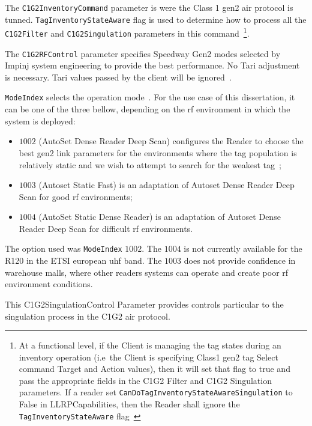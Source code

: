 The \texttt{C1G2InventoryCommand} parameter is were the Class 1 \ac{gen2} air protocol is tunned.
\texttt{TagInventoryStateAware} flag is used to determine how to process all the \texttt{C1G2Filter} and \texttt{C1G2Singulation} parameters in this command~\footnote{At a functional level, if the Client is managing the tag states during an inventory operation (i.e\ the Client is specifying Class1 \ac{gen2} tag Select command Target and Action values), then it will set that flag to true and pass the appropriate fields in the C1G2 Filter and C1G2 Singulation parameters. If a reader set \texttt{CanDoTagInventoryStateAwareSingulation} to False in LLRPCapabilities, then the Reader shall ignore the \texttt{TagInventoryStateAware} flag~\cite{LowLevelReader}}.

The \texttt{C1G2RFControl} parameter specifies Speedway Gen2 modes selected by Impinj system engineering to provide the best performance. No Tari adjustment is necessary. Tari values passed by the client will be ignored~\cite{ImpinjOctaneLLRP}.

\texttt{ModeIndex} selects the operation mode~\cite{ReaderModesMade, ImpinjOctaneLLRP}. For the use case of this dissertation, it can be one of the three bellow, depending on the \ac{rf} environment in which the system is deployed: 

\begin{itemize}
    \item $1002$ (AutoSet Dense Reader Deep Scan) configures the Reader to choose the best \ac{gen2} link parameters for the environments where the tag population is relatively static and we wish to attempt to search for the weakest tag~\cite{ReaderMode1002};
    \item $1003$ (Autoset Static Fast) is an adaptation of Autoset Dense Reader Deep Scan for good \ac{rf} environments;
    \item $1004$ (AutoSet Static Dense Reader) is an adaptation of Autoset Dense Reader Deep Scan for difficult \ac{rf} environments.
\end{itemize}

The option used was \texttt{ModeIndex} $1002$. The $1004$ is not currently available for the R120 in the ETSI european \ac{uhf} band. The $1003$ does not provide confidence in warehouse malls, where other readers systems can operate and create poor \ac{rf} environment conditions.


This C1G2SingulationControl Parameter provides controls particular to the singulation process in the C1G2 air protocol.

